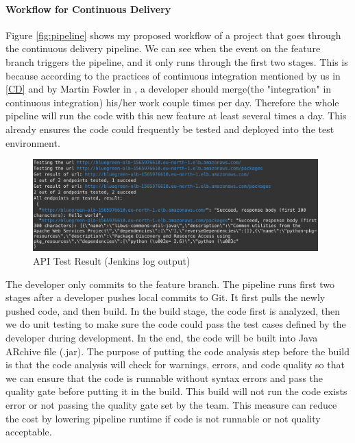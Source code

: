 \paragraph[]{Workflow for Continuous Delivery}
\label{workflow}
Figure \ref{fig:pipeline} shows my proposed workflow of a project that goes through the continuous delivery pipeline.
We can see when the event on the feature branch triggers the pipeline, and it only runs through the first two stages. This is because according to the practices of continuous integration mentioned by us in \ref{CD} and by Martin Fowler in \cite{fowler2006continuous}, a developer should merge(the "integration" in continuous integration) his/her work couple times per day. Therefore the whole pipeline will run the code with this new feature at least several times a day. This already ensures the code could frequently be tested and deployed into the test environment.
\begin{figure}[!h]
     \centering
     \includegraphics[width=0.98\textwidth]{pics/test_result.png}
     \caption{API Test Result (Jenkins log output)}
     \label{fig:test-result}
    \end{figure}
\par
The developer only commits to the feature branch. The pipeline runs first two stages after a developer pushes local commits to Git. It first pulls the newly pushed code, and then build. In the build stage, the code first is analyzed, then we do unit testing to make sure the code could pass the test cases defined by the developer during development. In the end, the code will be built into Java ARchive file (.jar). The purpose of putting the code analysis step before the build is that the code analysis will check for warnings, errors, and code quality so that we can ensure that the code is runnable without syntax errors and pass the quality gate before putting it in the build. This build will not run the code exists error or not passing the quality gate set by the team. This measure can reduce the cost by lowering pipeline runtime if code is not runnable or not quality acceptable. 
\par
